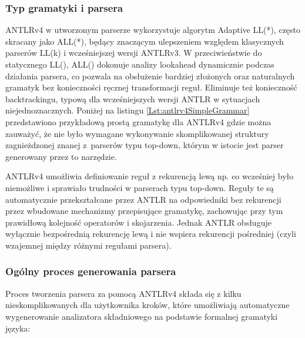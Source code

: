 \documentclass[12pt,twoside]{article}
\begin{document}
\subsubsection{Typ gramatyki i parsera}
ANTLRv4 w utworzonym parserze wykorzystuje algorytm Adaptive LL(*), często skracany jako ALL(*), będący znaczącym ulepszeniem względem klasycznych parserów LL(k) i wcześniejszej wersji ANTLRv3. W przeciwieństwie do statycznego LL(), ALL() dokonuje analizy lookahead dynamicznie podczas działania parsera, co pozwala na obsłużenie bardziej złożonych oraz naturalnych gramatyk bez konieczności ręcznej transformacji reguł.\cite{antlr4GitHub} Eliminuje też konieczność backtrackingu, typową dla wcześniejszych wersji ANTLR w sytuacjach niejednoznacznych\cite{Antlr4Optimisation}. Poniżej na listingu \ref{Lst:antlrv4SimpleGrammar} przedstawiono przykładową prostą gramatykę dla ANTLRv4 gdzie można zauważyć, że nie było wymagane wykonywanie skomplikowanej struktury zagnieżdzonej znanej z~parserów typu top-down\cite{antlr4Book}, którym w istocie jest parser generowany przez to narzędzie.



ANTLRv4 umożliwia definiowanie reguł z rekurencją lewą np.  co wcześniej było niemożliwe i sprawiało trudności w parserach typu top-down. Reguły te są automatycznie przekształcane przez ANTLR na odpowiedniki bez rekurencji przez wbudowane mechanizmy przepisujące gramatykę, zachowując przy tym prawidłową kolejność operatorów i skojarzenia. Jednak ANTLR obsługuje wyłącznie bezpośrednią rekurencję lewą i nie wspiera rekurencji pośredniej (czyli wzajemnej między różnymi regułami parsera).

\subsubsection{Ogólny proces generowania parsera}
Proces tworzenia parsera za pomocą ANTLRv4 składa się z kilku nieskomplikowanych dla użytkownika kroków, które umożliwiają automatyczne wygenerowanie analizatora składniowego na podstawie formalnej gramatyki języka:
\end{document}
